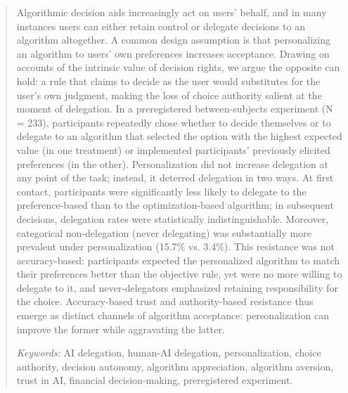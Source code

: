 \documentclass[a4paper, 12pt, fleqn]{article}
\theoremstyle{definition}
\begin{document}
\begin{abstract}
  Algorithmic decision aids increasingly act on users’ behalf, and in many instances users can either retain control or delegate decisions to an algorithm altogether. A common design assumption is that personalizing an algorithm to users' own preferences increases acceptance. Drawing on accounts of the intrinsic value of decision rights, we argue the opposite can hold: a rule that claims to decide as the user would substitutes for the user's own judgment, making the loss of choice authority salient at the moment of delegation. In a preregistered between-subjects experiment (N = 233), participants repeatedly chose whether to decide themselves or to delegate to an algorithm that selected the option with the highest expected value (in one treatment) or implemented participants' previously elicited preferences (in the other). Personalization did not increase delegation at any point of the task; instead, it deterred delegation in two ways. At first contact, participants were significantly less likely to delegate to the preference-based than to the optimization-based algorithm; in subsequent decisions, delegation rates were statistically indistinguishable. Moreover, categorical non-delegation (never delegating) was substantially more prevalent under personalization (15.7\% vs. 3.4\%). 
  This resistance was not accuracy-based: participants expected the personalized algorithm to match their preferences better than the objective rule, yet were no more willing to delegate to it, and never-delegators emphasized retaining responsibility for the choice. Accuracy-based trust and authority-based resistance thus emerge as distinct channels of algorithm acceptance: personalization can improve the former while aggravating the latter.
  
     \vspace{.25cm}
  \textit{Keywords:} {AI delegation, human-AI delegation, personalization, choice authority, decision autonomy, algorithm appreciation, algorithm aversion, trust in AI, financial decision-making, preregistered experiment.}\vspace{.15cm}
\end{abstract}
\vspace{-.5cm}
\end{document}
